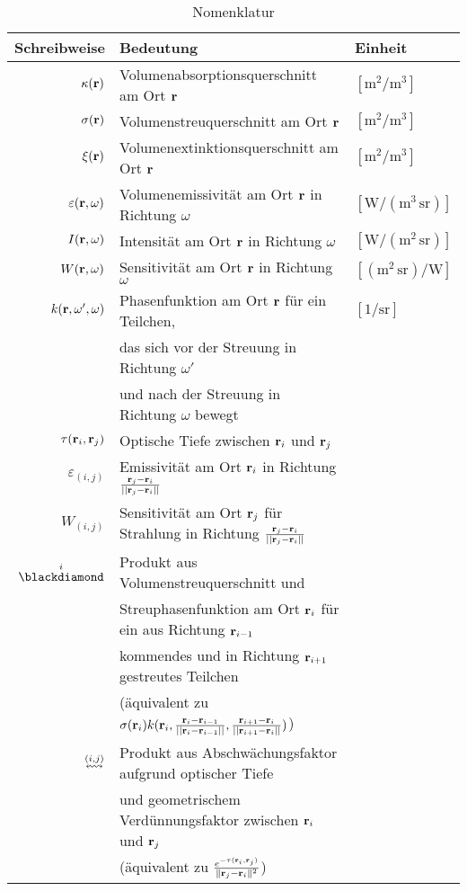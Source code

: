 	\begin{table}
		\caption{Nomenklatur}
		\begin{center}
		\begin{tabular}{rll}
			Schreibweise & Bedeutung & Einheit \\
			\hline
			$\kappa(\mathbf{r})$ & Volumenabsorptionsquerschnitt am Ort $\mathbf{r}$& $\left[\text{m}^2/\text{m}^3\right]$ \\
			$\sigma(\mathbf{r})$ & Volumenstreuquerschnitt am Ort $\mathbf{r}$ & $\left[\text{m}^2/\text{m}^3\right]$ \\
			$\xi(\mathbf{r})$ & Volumenextinktionsquerschnitt am Ort $\mathbf{r}$ & $\left[\text{m}^2/\text{m}^3\right]$ \\
			$\varepsilon(\mathbf{r},\omega)$ & Volumenemissivität am Ort $\mathbf{r}$ in Richtung $\omega$ & $\left[\text{W}/(\text{m}^3\,\text{sr})\right]$ \\
			$I(\mathbf{r},\omega)$ & Intensität am Ort $\mathbf{r}$ in Richtung $\omega$& $\left[\text{W}/(\text{m}^2\,\text{sr})\right]$ \\
			$W(\mathbf{r},\omega)$ & Sensitivität am Ort $\mathbf{r}$ in Richtung $\omega$ & $\left[(\text{m}^2\,\text{sr})/\text{W}\right]$ \\
			$k(\mathbf{r},\omega',\omega)$ & Phasenfunktion am Ort $\mathbf{r}$ für ein Teilchen, & $\left[1/\text{sr}\right]$ \\
				&das sich vor der Streuung in Richtung $\omega'$&\\
				&und nach der Streuung in Richtung $\omega$ bewegt& \\
			$\tau(\mathbf{r}_i,\mathbf{r}_j)$ & Optische Tiefe zwischen $\mathbf{r}_i$ und $\mathbf{r}_j$ & \\
			$\varepsilon_{(i,j)}$ & Emissivität am Ort $\mathbf{r}_i$ in Richtung $\frac{\mathbf{r}_j-\mathbf{r}_i}{||\mathbf{r}_j-\mathbf{r}_i||}$ & \\
			$W_{(i,j)}$ & Sensitivität am Ort $\mathbf{r}_j$ für Strahlung in Richtung $\frac{\mathbf{r}_j-\mathbf{r}_i}{||\mathbf{r}_j-\mathbf{r}_i||}$ & \\
			$\scatter{i}$ & Produkt aus Volumenstreuquerschnitt und&\\
			  & Streuphasenfunktion am Ort $\mathbf{r}_i$ für ein aus Richtung $\mathbf{r}_{i-1}$&\\ 
				&kommendes und in Richtung $\mathbf{r}_{i+1}$ gestreutes Teilchen&\\
				&(äquivalent zu $\sigma(\mathbf{r}_i)k(\mathbf{r}_i,\frac{\mathbf{r}_i-\mathbf{r}_{i-1}}{||\mathbf{r}_i-\mathbf{r}_{i-1}||},\frac{\mathbf{r}_{i+1}-\mathbf{r}_i}{||\mathbf{r}_{i+1}-\mathbf{r}_i||})$)& \\
			$\overset{(i,j)}{\leftrightsquigarrow}$ & Produkt aus Abschwächungsfaktor aufgrund optischer Tiefe&\\
			  &und geometrischem Verdünnungsfaktor zwischen $\mathbf{r}_i$ und $\mathbf{r}_{j}$&\\ 
				&(äquivalent zu $\frac{e^{-\tau(\mathbf{r}_{i},\mathbf{r}_j)}}{\|\mathbf{r}_j-\mathbf{r}_{i}\|^2}$)& \\
			
		\end{tabular}
		\end{center}
		\label{tab:nomenklatur}
	\end{table}
